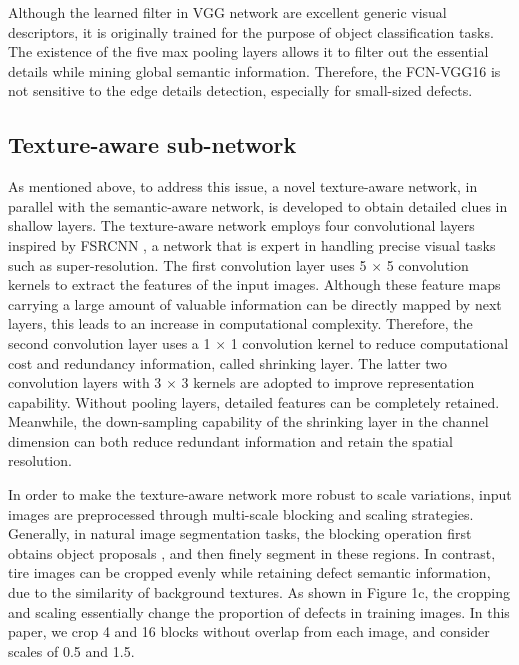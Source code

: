 \documentclass{article}
\begin{document}
Although the learned filter in VGG network are excellent generic visual descriptors, it is originally trained for the purpose of object classification tasks. The existence of the five max pooling layers allows it to filter out the essential details while mining global semantic information. Therefore, the FCN-VGG16 is not sensitive to the edge details detection, especially for small-sized defects.

\subsection{Texture-aware sub-network}
\label{Texture-aware sub-network}
As mentioned above, to address this issue, a novel texture-aware network, in parallel with the semantic-aware network, is developed to obtain detailed clues in shallow layers. The texture-aware network employs four convolutional layers inspired by FSRCNN \cite{dong2016accelerating}, a network that is expert in handling precise visual tasks such as super-resolution. The first convolution layer uses 5 $\times$ 5 convolution kernels to extract the features of the input images. Although these feature maps carrying a large amount of valuable information can be directly mapped by next layers, this leads to an increase in computational complexity. Therefore, the second convolution layer uses a 1 $\times$ 1 convolution kernel to reduce computational cost and redundancy information, called shrinking layer. The latter two convolution layers with 3 $\times$ 3 kernels are adopted to improve representation capability. Without pooling layers, detailed features can be completely retained. Meanwhile, the down-sampling capability of the shrinking layer in the channel dimension can both reduce redundant information and retain the spatial resolution.

In order to make the texture-aware network more robust to scale variations, input images are preprocessed through multi-scale blocking and scaling strategies. Generally, in natural image segmentation tasks, the blocking operation first obtains object proposals \cite{girshick2014rich,ren2015faster}, and then finely segment in these regions. In contrast, tire images can be cropped evenly while retaining defect semantic information, due to the similarity of background textures. As shown in Figure 1c, the cropping and scaling essentially change the proportion of defects in training images. In this paper, we crop 4 and 16 blocks without overlap from each image, and consider scales of 0.5 and 1.5.
\end{document}
